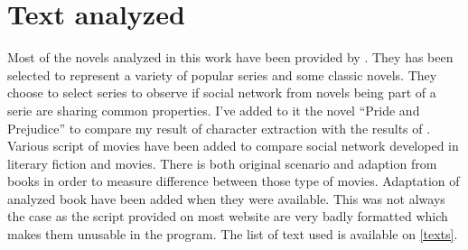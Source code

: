 \documentclass[a4paper, 12pt]{report}
\begin{document}
\section{Text analyzed}
Most of the novels analyzed in this work have been provided by \cite{original}. They has been selected to represent a variety of popular series and some classic novels. They choose to select series to observe if social network from novels being part of a serie are sharing common properties.  I've added to it the novel ``Pride and Prejudice'' to compare my result of character extraction with the results of \cite{character_meta}.
Various script of movies have been added to compare social network developed in literary fiction and movies. There is both original scenario and adaption from books in order to measure difference between those type of movies. Adaptation of analyzed book have been added when they were available. This was not always the case as the script provided on most website are very badly formatted which makes them unusable in the program. The list of text used is available on \ref{texts}.


\begin{table}
\center
{}
\caption{Novels and script whose social network has been extracted. `Pride and prejudice' has been used under the form of the novel and under the form of the adaptation's script. In total there is 46 novels and 25 scripts.}
\label{texts}
\end{table}
\end{document}

